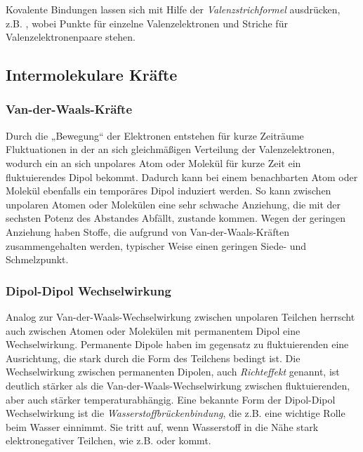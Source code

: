 \documentclass{scrartcl}
\begin{document}
Kovalente Bindungen lassen sich mit Hilfe der \emph{Valenzstrichformel} ausdrücken, z.B. , wobei Punkte für einzelne Valenzelektronen und Striche für Valenzelektronenpaare stehen.
\subsection{Intermolekulare Kräfte}
\subsubsection{Van-der-Waals-Kräfte}
Durch die „Bewegung“ der Elektronen entstehen für kurze Zeiträume Fluktuationen in der an sich gleichmäßigen Verteilung der Valenzelektronen, wodurch ein an sich unpolares Atom oder Molekül für kurze Zeit ein fluktuierendes Dipol bekommt. Dadurch kann bei einem benachbarten Atom oder Molekül ebenfalls ein temporäres Dipol induziert werden. So kann zwischen unpolaren Atomen oder Molekülen eine sehr schwache Anziehung, die mit der sechsten Potenz des Abstandes Abfällt, zustande kommen. Wegen der geringen Anziehung haben Stoffe, die aufgrund von Van-der-Waals-Kräften zusammengehalten werden, typischer Weise einen geringen Siede- und Schmelzpunkt.
\subsubsection{Dipol-Dipol Wechselwirkung}
Analog zur Van-der-Waals-Wechselwirkung zwischen unpolaren Teilchen herrscht auch zwischen Atomen oder Molekülen mit permanentem Dipol eine Wechselwirkung. Permanente Dipole haben im gegensatz zu fluktuierenden eine Ausrichtung, die stark durch die Form des Teilchens bedingt ist. Die Wechselwirkung zwischen permanenten Dipolen, auch \emph{Richteffekt} genannt, ist deutlich stärker als die Van-der-Waals-Wechselwirkung zwischen fluktuierenden, aber auch stärker temperaturabhängig. 
Eine bekannte Form der Dipol-Dipol Wechselwirkung ist die \emph{Wasserstoffbrückenbindung}, die z.B. eine wichtige Rolle beim Wasser einnimmt. Sie tritt auf, wenn Wasserstoff in die Nähe stark elektronegativer Teilchen, wie z.B.  oder  kommt.
\end{document}
